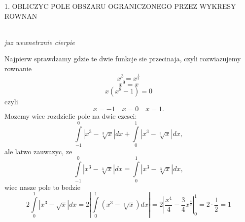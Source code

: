 \documentclass{article}
\begin{document}
\ttfamily
{\large\color{def}1. OBLICZYC POLE OBSZARU OGRANICZONEGO PRZEZ WYKRESY ROWNAN}\bigskip

\medskip\\
\emph{juz wewnetrznie cierpie}

Najpierw sprawdzamy gdzie te dwie funkcje sie przecinaja, czyli rozwiazujemy rownanie
$$x^3=x^\frac13$$
$$x^9=x$$
$$x(x^8-1) = 0$$
czyli
$$x=-1\quad x=0\quad x=1.$$
Mozemy wiec rozdzielic pole na dwie czesci:
$$\int\limits_{-1}^0|x^3-\sqrt[3]{x}|dx+\int\limits_0^1|x^3-\sqrt[3]{x}|dx,$$
ale latwo zauwazyc, ze
$$\int\limits_{-1}^0|x^3-\sqrt[3]{x}|dx=\int\limits_0^1|x^3-\sqrt[3]{x}|dx,$$
wiec nasze pole to bedzie
$$2\int\limits_{0}^1 |x^3-\sqrt{x}|dx = 2|\int\limits_0^1(x^3-\sqrt[3]{x})dx|=2|\frac{x^4}4-\frac34x^{\frac43}|_0^1=2\cdot \frac12=1$$
\end{document}
